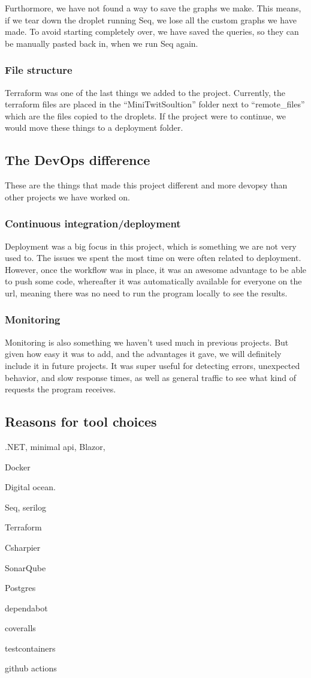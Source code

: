 Furthormore, we have not found a way to save the graphs we make.
This means, if we tear down the droplet running Seq,
we lose all the custom graphs we have made.
To avoid starting completely over, we have saved the queries,
so they can be manually pasted back in, when we run Seq again.

\subsubsection{File structure}

Terraform was one of the last things we added to the project.
Currently, the terraform files are placed in the ``MiniTwitSoultion'' 
folder next to ``remote\_files'' which are the files copied to the droplets.
If the project were to continue, we would move these things to a deployment folder.

\subsection{The DevOps difference}

These are the things that made this project different and more devopsy
than other projects we have worked on.

\subsubsection{Continuous integration/deployment}

Deployment was a big focus in this project, 
which is something we are not very used to.
The issues we spent the most time on were often related to deployment.
However, once the workflow was in place, it was
an awesome advantage to be able to push some code,
whereafter it was automatically available for everyone on the url, 
meaning there was no need to run the program locally to see the results.

\subsubsection{Monitoring}

Monitoring is also something we haven't used much in previous projects.
But given how easy it was to add, and the advantages it gave,
we will definitely include it in future projects.
It was super useful for detecting errors, unexpected behavior,
and slow response times, as well as general traffic to see 
what kind of requests the program receives.


\subsection{Reasons for tool choices}

.NET, minimal api, Blazor,

Docker

Digital ocean.

Seq, serilog

Terraform

Csharpier

SonarQube

Postgres

dependabot

coveralls

testcontainers

github actions